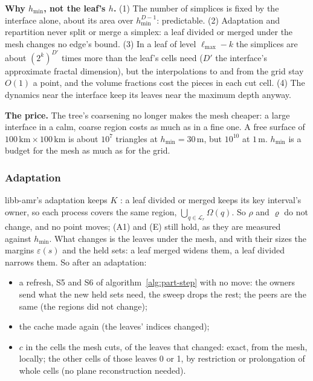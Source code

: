 \documentclass[10pt,a4paper]{article}
\theoremstyle{definition}
\begin{document}
\textbf{Why $h_{\min}$, not the leaf's $h$.} (1) The number of simplices
is fixed by the interface alone, about its area over $h_{\min}^{D-1}$:
predictable. (2) Adaptation and repartition never split or merge a
simplex: a leaf divided or merged under the mesh changes no edge's bound.
(3) In a leaf of level $\ell_{\max} - k$ the simplices are about
$(2^k)^{D'}$ times more than the leaf's cells need ($D'$ the interface's
approximate fractal dimension), but the interpolations to and from the
grid stay $O(1)$ a point, and the volume fractions cost the pieces in each
cut cell. (4) The dynamics near the interface keep its leaves near the
maximum depth anyway.

\textbf{The price.} The tree's coarsening no longer makes the mesh
cheaper: a large interface in a calm, coarse region costs as much as in a
fine one. A free surface of $100\,\mathrm{km} \times 100\,\mathrm{km}$
is about $10^7$ triangles at $h_{\min} = 30\,\mathrm{m}$, but $10^{10}$
at $1\,\mathrm{m}$. $h_{\min}$ is a budget for the mesh as much as for
the grid.

\subsubsection{Adaptation}

libb-amr's adaptation keeps $K$ \cite{bamrpart}: a leaf divided or merged
keeps its key interval's owner, so each process covers the same region,
$\bigcup_{q \in \mathcal{L}_r} \Omega(q)$. So $\rho$ and $\varrho$ do not
change, and no point moves; (A1) and (E) still hold, as they are measured
against $h_{\min}$. What changes is the leaves under the mesh, and with
their sizes the margins $\varepsilon(s)$ and the held sets: a leaf merged
widens them, a leaf divided narrows them. So after an adaptation:
\begin{itemize}
  \item a refresh, S5 and S6 of algorithm~\ref{alg:part-step} with no
    move: the owners send what the new held sets need, the sweep drops the
    rest; the peers are the same (the regions did not change);
  \item the cache made again (the leaves' indices changed);
  \item $c$ in the cells the mesh cuts, of the leaves that changed: exact,
    from the mesh, locally; the other cells of those leaves 0 or 1, by
    restriction or prolongation of whole cells (no plane reconstruction
    needed).
\end{itemize}
\end{document}
